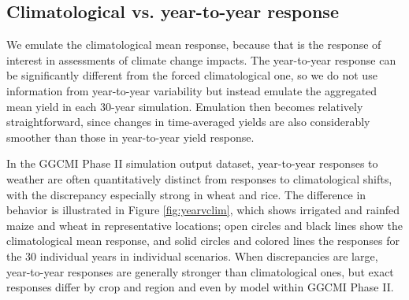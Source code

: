 \documentclass[gmd, manuscript]{copernicus} %
\begin{document}
\subsection{Climatological vs. year-to-year response}

We emulate the climatological mean response, because that is the response of interest in assessments of climate change impacts. 
The year-to-year response can be significantly different from the forced climatological one, so we do not use information from year-to-year variability but instead emulate the aggregated mean yield in each 30-year simulation. 
Emulation then becomes relatively straightforward, since changes in time-averaged yields are also considerably smoother than those in year-to-year yield response.

In the GGCMI Phase II simulation output dataset, year-to-year responses to weather are often quantitatively distinct from responses to climatological shifts, with the discrepancy especially strong in wheat and rice. 
The difference in behavior is illustrated in Figure \ref{fig:yearvclim}, which shows irrigated and rainfed maize and wheat in representative locations; open circles and black lines show the climatological mean response, and solid circles and colored lines the responses for the 30 individual years in individual scenarios.
When discrepancies are large, year-to-year responses are generally stronger than climatological ones, but exact responses differ by crop and region and even by model within GGCMI Phase II. 
\end{document}
